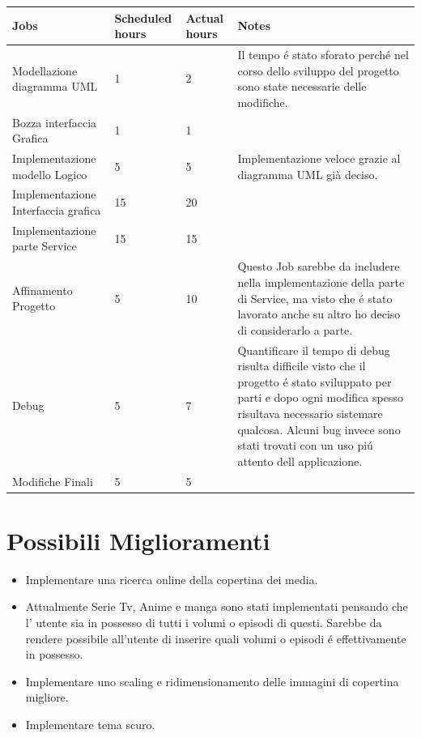 \documentclass[a4paper,12pt]{article}
\begin{document}
\begin{table}[h!]
\centering
\begin{tabularx}{\textwidth}{p{4cm} p{2cm} p{2cm} X}
\hline
\textbf{Jobs} & \textbf{Scheduled hours} & \textbf{Actual hours} & \textbf{Notes} \\
\hline
Modellazione diagramma UML          & 1  & 2  & Il tempo é stato sforato perché nel corso dello sviluppo del progetto sono state necessarie delle modifiche. \\
Bozza interfaccia Grafica           & 1  & 1  &   \\
Implementazione modello Logico      & 5  & 5  & Implementazione veloce grazie al diagramma UML già deciso. \\
Implementazione Interfaccia grafica & 15 & 20 &   \\
Implementazione parte Service       & 15 & 15 &   \\
Affinamento Progetto                & 5  & 10 & Questo Job sarebbe da includere nella implementazione della parte di Service, ma visto che é stato lavorato anche su altro ho deciso di considerarlo a parte. \\
Debug                               & 5  & 7  & Quantificare il tempo di debug risulta difficile visto che il progetto é stato sviluppato per parti e dopo ogni modifica spesso risultava necessario sistemare qualcosa. Alcuni bug invece sono stati trovati con un uso piú attento dell applicazione. \\
Modifiche Finali                    & 5  & 5  &   \\
\hline
\end{tabularx}
\end{table}

\section{Possibili Miglioramenti}
\begin{itemize}
    \item Implementare una ricerca online della copertina dei media.
    \item Attualmente Serie Tv, Anime e manga sono stati implementati pensando che l' utente sia in possesso di tutti i volumi o episodi di questi. Sarebbe da rendere possibile all'utente di inserire quali volumi o episodi é effettivamente in possesso.
    \item Implementare uno scaling e ridimensionamento delle immagini di copertina migliore.
    \item Implementare tema scuro.
\end{itemize}
\end{document}
